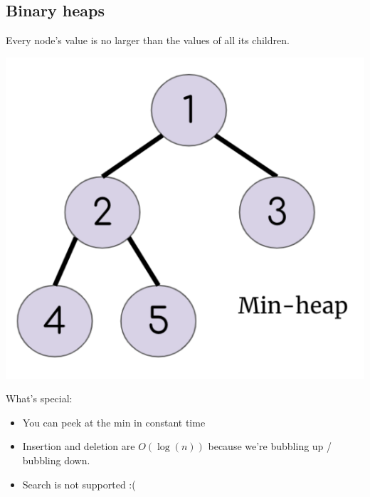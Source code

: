 \documentclass[12pt]{article}
\begin{document}
\subsection*{Binary heaps}
Every node's value is no larger than the values of all its children.
\begin{center}
\includegraphics[scale=0.5]{minheap.png} 
\end{center}
What's special: 
\begin{itemize}
    \item You can peek at the min in constant time
    \item Insertion and deletion are $O(\log(n))$ because we're bubbling up / bubbling down. 
    \item Search is not supported :( 
\end{itemize}
\end{document}

